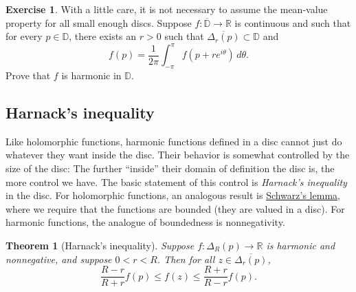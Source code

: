 \documentclass[12pt,openany]{book}
\newcommand{\R}{{\mathbb{R}}}
\newcommand{\D}{{\mathbb{D}}}
\newcommand{\myquote}[1]{``#1''}
\theoremstyle{plain}
\newtheorem{thm}{Theorem}[section]
\theoremstyle{remark}
\theoremstyle{definition}
\newenvironment{exbox}{%
    \def\FrameCommand{\vrule width 1pt \relax\hspace{10pt}}%
    \MakeFramed{\advance\hsize-\width\FrameRestore}%
}{%
    \endMakeFramed
}
\theoremstyle{exercise}
\newtheorem{exercise}{Exercise}[section]
\theoremstyle{example}
\begin{document}
\begin{exbox}
\begin{exercise}
With a little care,
it is not necessary to assume the mean-value property for all small enough discs.
Suppose $f \colon \overline{\D} \to \R$ is
continuous and such that for every $p \in \D$, there exists an $r > 0$ such that
$\overline{\Delta_r(p)} \subset \D$ and 
\begin{equation*}
f(p) = \frac{1}{2\pi} \int_{-\pi}^{\pi} f(p+re^{i\theta})\, d\theta .
\end{equation*}
Prove that $f$ is harmonic in $\D$.
\end{exercise}
\end{exbox}

\subsection{Harnack's inequality}

Like holomorphic functions, harmonic functions defined in a
disc cannot just do whatever they want inside the disc.  Their behavior is
somewhat controlled by the size of the disc:  The further
\myquote{inside} their domain of definition the disc is, the more control we have.
The basic statement of this control is
\emph{Harnack's inequality} in the disc.
For holomorphic functions, an analogous result is
\hyperref[lemma:schwarz]{Schwarz's lemma}, where we
require that the functions are bounded (they are valued in a disc).  For harmonic
functions, the analogue of boundedness is nonnegativity.

\begin{thm}[Harnack's inequality]
\label{thm:harnackineqdisc}
Suppose $f \colon \Delta_R(p) \to \R$ is harmonic and nonnegative,
and suppose $0 < r < R$.
Then for all $z \in \overline{\Delta_r(p)}$,
\begin{equation*}
\frac{R-r}{R+r} f(p) \leq f(z) \leq \frac{R+r}{R-r} f(p) .
\end{equation*}
\end{thm}
\end{document}
